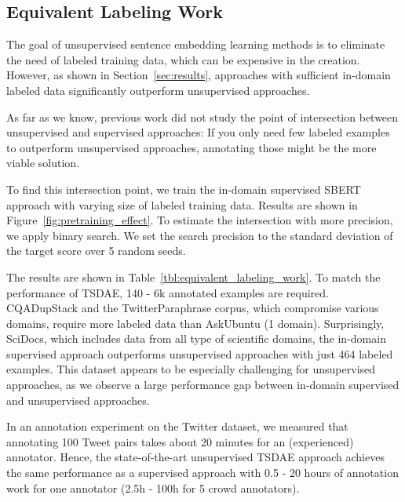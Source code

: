 \documentclass[11pt,a4paper]{article}
\begin{document}
\begin{table}[t]
\centering
{}
\caption{Intersection point (number of labeled sentence pairs) between unsupervised TSDAE and in-domain supervised SBERT.}
\label{tbl:equivalent_labeling_work}
\end{table}

\subsection{Equivalent Labeling Work} 
The goal of unsupervised sentence embedding learning methods is to eliminate the need of labeled training data, which can be expensive in the creation. However, as shown in Section~\ref{sec:results}, approaches with sufficient in-domain labeled data significantly outperform unsupervised approaches. 

As far as we know, previous work did not study the point of intersection between unsupervised and supervised approaches: If you only need few labeled examples to outperform unsupervised approaches, annotating those might be the more viable solution.

To find this intersection point, we train the in-domain supervised SBERT approach with varying size of labeled training data. Results are shown in Figure~\ref{fig:pretraining_effect}. To estimate the intersection with more precision, we apply binary search. We set the search precision to the standard deviation of the target score over 5 random seeds.


The results are shown in Table~\ref{tbl:equivalent_labeling_work}. To match the performance of TSDAE, 140 - 6k annotated examples are required. CQADupStack and the TwitterParaphrase corpus, which compromise various domains, require more labeled data than AskUbuntu (1 domain). Surprisingly, SciDocs, which includes data from all type of scientific domains, the in-domain supervised approach outperforms unsupervised approaches with just 464 labeled examples. This dataset appears to be especially challenging for unsupervised approaches, as we observe a large performance gap between in-domain supervised and unsupervised approaches.


In an annotation experiment on the Twitter dataset, we measured that annotating 100 Tweet pairs takes about 20 minutes for an (experienced) annotator. Hence, the state-of-the-art unsupervised TSDAE approach achieves the same performance as a supervised approach with  0.5 - 20 hours of annotation work for one annotator (2.5h - 100h for 5 crowd annotators).  
\end{document}
